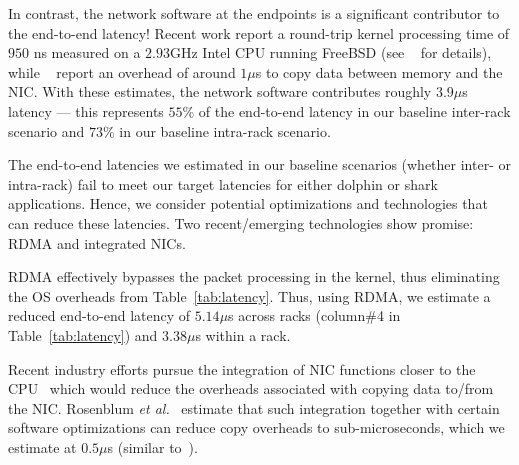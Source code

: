 In contrast, the network software at the endpoints is a significant contributor to the end-to-end latency! Recent work report a round-trip kernel processing time of $950$ ns measured on a $2.93$GHz Intel CPU running FreeBSD (see ~\cite{luigi} for details), while ~\cite{ramcloud} report 
an overhead of around $1\mu$s to copy data between memory and the NIC.
With these estimates, the network software contributes roughly $3.9\mu$s latency --- this represents $55\%$ of the end-to-end latency in our baseline inter-rack scenario and $73\%$ in our baseline intra-rack scenario.

The end-to-end latencies we estimated in our baseline scenarios (whether inter- or intra-rack) 
fail to meet our target latencies for either dolphin or shark applications. Hence, we consider potential optimizations and technologies that can reduce these latencies. 
Two recent/emerging technologies show promise: RDMA and integrated NICs.




RDMA effectively bypasses the packet processing in the kernel, thus eliminating the OS overheads from Table~\ref{tab:latency}.
Thus, using RDMA, we estimate a reduced end-to-end latency of $5.14\mu$s across racks (column\#4 in Table~\ref{tab:latency}) 
and $3.38\mu$s within a rack.

Recent industry efforts pursue the integration of NIC functions closer to the CPU~\cite{cpu-nic} which would reduce the overheads associated with copying data to/from the NIC. Rosenblum {\it et al.}~\cite{lowlatency} estimate that such integration together with certain software  optimizations can reduce copy overheads to sub-microseconds, which we estimate at $0.5\mu$s (similar to~\cite{lowlatency}). 

